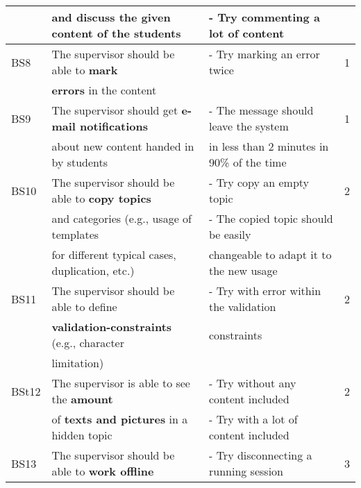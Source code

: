 \documentclass[twoside,openright,fleqn,pointlessnumbers,headinclude,,11pt,a4paper,BCOR5mm,footinclude,cleardoubleempty,abstracton %
                ]{scrreprt}
\begin{document}
\begin{table}[h]
\begin{tabular}{llll}
		& \textbf{and discuss} the given content of the students 	&- Try commenting a lot of content		& \\	
	\hline
	BS8 	& The supervisor should be able to \textbf{mark} 	& - Try marking an error twice & 1\\
		& \textbf{errors} in the content					&	& \\
	\hline
	BS9 	& The supervisor should get \textbf{e-mail notifications} 	& - The message should leave the system  & 1\\
		& about new content handed in by students		& in less than 2 minutes in 90\% of the time	& \\
	\hline
	BS10& The supervisor should be able to \textbf{copy topics} 		& - Try copy an empty topic  		& 2\\
		& and categories (e.g., usage of templates				& - The copied topic should be easily		&		\\
		& for different typical cases, duplication, etc.)				& changeable to adapt it to the new usage		& \\
	\hline
	BS11& The supervisor should be able to define 				& - Try with error within the validation & 2\\
		& \textbf{validation-constraints} (e.g., character			& constraints & \\
		& limitation)										& 			& \\
	\hline
	BSt12& The supervisor is able to see the \textbf{amount}		& - Try without any content included & 2\\
		& of \textbf{texts and pictures} in a hidden topic			& - Try with a lot of content included	& \\
	\hline
	BS13& The supervisor should be able to \textbf{work offline} 	& - Try disconnecting a running session & 3\\
	\hline
	\end{tabular}
	\label{RequirementsBackendSupervisor}
	\end{table}
\end{document}

